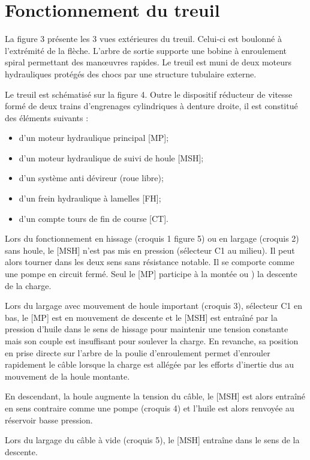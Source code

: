 \documentclass[10pt]{article}
\begin{document}
\section{Fonctionnement du treuil}
La figure 3 présente les 3 vues extérieures du treuil. Celui-ci est boulonné à l'extrémité de la flèche. L'arbre de sortie supporte une bobine à enroulement spiral permettant des man\oe{}uvres rapides. Le treuil est muni de deux moteurs hydrauliques protégés des chocs par une structure tubulaire externe. 

Le treuil est schématisé sur la figure 4. Outre le dispositif réducteur de vitesse formé de deux trains d'engrenages cylindriques à denture droite, il est constitué des éléments suivants : 
\begin{itemize}
\item d'un moteur hydraulique principal [MP];
\item d'un moteur hydraulique de suivi de houle [MSH];
\item d'un système anti dévireur (roue libre);
\item d'un frein hydraulique à lamelles [FH];
\item d'un compte tours de fin de course [CT].
\end{itemize}

Lors du fonctionnement en hissage (croquis 1 figure 5) ou en largage (croquis 2) sans houle, le [MSH] n'est pas mis en pression (sélecteur C1 au milieu). Il peut alors tourner dans les deux sens sans résistance notable. Il se comporte comme une pompe en circuit fermé. Seul le [MP] participe à la montée ou ) la descente de la charge. 

Lors du largage avec mouvement de houle important (croquis 3), sélecteur C1 en bas, le [MP] est en mouvement de descente et le [MSH] est entraîné par la pression d'huile dans le sens de hissage pour maintenir une tension constante mais son couple est insuffisant pour soulever la charge. En revanche, sa position en prise directe sur l'arbre de la poulie d'enroulement permet d'enrouler rapidement le câble lorsque la charge est allégée par les efforts d'inertie dus au mouvement de la houle montante. 

En descendant, la houle augmente la tension du câble, le [MSH] est alors entraîné en sens contraire comme une pompe (croquis 4) et l'huile est alors renvoyée au réservoir basse pression.

Lors du largage du câble à vide (croquis 5), le [MSH] entraîne dans le sens de la descente. 
\end{document}

